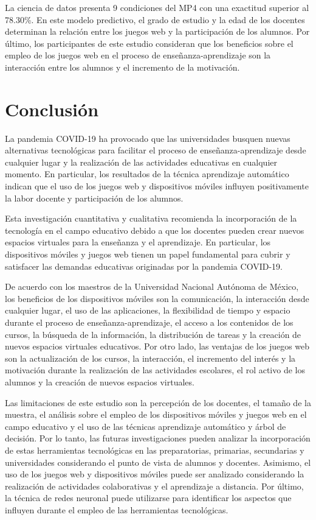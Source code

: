 \documentclass[spanish]{textolivre}
\begin{document}
La ciencia de datos presenta 9 condiciones del MP4 con una exactitud superior al 78.30\%. En este modelo predictivo, el grado de estudio y la edad de los docentes determinan la relación entre los juegos web y la participación de los alumnos. Por último, los participantes de este estudio consideran que los beneficios sobre el empleo de los juegos web en el proceso de enseñanza-aprendizaje son la interacción entre los alumnos y el incremento de la motivación.

\section{Conclusión}
La pandemia COVID-19 ha provocado que las universidades busquen nuevas alternativas tecnológicas para facilitar el proceso de enseñanza-aprendizaje desde cualquier lugar y la realización de las actividades educativas en cualquier momento. En particular, los resultados de la técnica aprendizaje automático indican que el uso de los juegos web y dispositivos móviles influyen positivamente la labor docente y participación de los alumnos.

Esta investigación cuantitativa y cualitativa recomienda la incorporación de la tecnología en el campo educativo debido a que los docentes pueden crear nuevos espacios virtuales para la enseñanza y el aprendizaje. En particular, los dispositivos móviles y juegos web tienen un papel fundamental para cubrir y satisfacer las demandas educativas originadas por la pandemia COVID-19.

De acuerdo con los maestros de la Universidad Nacional Autónoma de México, los beneficios de los dispositivos móviles son la comunicación, la interacción desde cualquier lugar, el uso de las aplicaciones, la flexibilidad de tiempo y espacio durante el proceso de enseñanza-aprendizaje, el acceso a los contenidos de los cursos, la búsqueda de la información, la distribución de tareas y la creación de nuevos espacios virtuales educativos. Por otro lado, las ventajas de los juegos web son la actualización de los cursos, la interacción, el incremento del interés y la motivación durante la realización de las actividades escolares, el rol activo de los alumnos y la creación de nuevos espacios virtuales.

Las limitaciones de este estudio son la percepción de los docentes, el tamaño de la muestra, el análisis sobre el empleo de los dispositivos móviles y juegos web en el campo educativo y el uso de las técnicas aprendizaje automático y árbol de decisión. Por lo tanto, las futuras investigaciones pueden analizar la incorporación de estas herramientas tecnológicas en las preparatorias, primarias, secundarias y universidades considerando el punto de vista de alumnos y docentes. Asimismo, el uso de los juegos web y dispositivos móviles puede ser analizado considerando la realización de actividades colaborativas y el aprendizaje a distancia. Por último, la técnica de redes neuronal puede utilizarse para identificar los aspectos que influyen durante el empleo de las herramientas tecnológicas.
\end{document}
